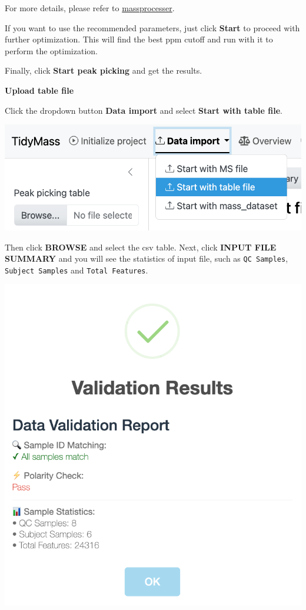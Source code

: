\documentclass[
]{book}
\begin{document}
For more details, please refer to \href{https://www.tidymass.org/massprocesser/articles/raw_data_processing.html}{massprocesser}.

If you want to use the recommended parameters, just click \textbf{Start} to proceed with further optimization. This will find the best ppm cutoff and run with it to perform the optimization.

Finally, click \textbf{Start peak picking} and get the results.

\textbf{Upload table file}

Click the dropdown button \textbf{Data import} and select \textbf{Start with table file}.

\includegraphics{figures/table_start.png}

Then click \textbf{BROWSE} and select the csv table. Next, click \textbf{INPUT FILE SUMMARY} and you will see the statistics of input file, such as \texttt{QC\ Samples}, \texttt{Subject\ Samples} and \texttt{Total\ Features}.

\includegraphics{figures/table_statistics.png}
\end{document}
